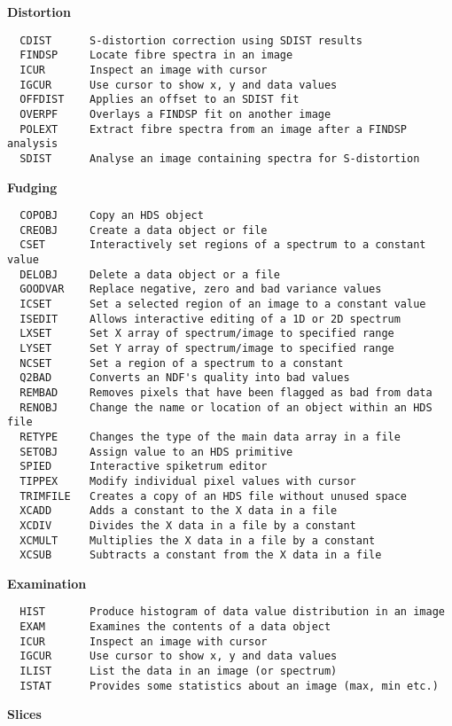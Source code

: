 \goodbreak
{\bf Distortion}
\begin{verbatim}
  CDIST      S-distortion correction using SDIST results
  FINDSP     Locate fibre spectra in an image
  ICUR       Inspect an image with cursor
  IGCUR      Use cursor to show x, y and data values
  OFFDIST    Applies an offset to an SDIST fit
  OVERPF     Overlays a FINDSP fit on another image
  POLEXT     Extract fibre spectra from an image after a FINDSP analysis
  SDIST      Analyse an image containing spectra for S-distortion
\end{verbatim}
\goodbreak
{\bf Fudging}
\begin{verbatim}
  COPOBJ     Copy an HDS object
  CREOBJ     Create a data object or file
  CSET       Interactively set regions of a spectrum to a constant value
  DELOBJ     Delete a data object or a file
  GOODVAR    Replace negative, zero and bad variance values
  ICSET      Set a selected region of an image to a constant value
  ISEDIT     Allows interactive editing of a 1D or 2D spectrum
  LXSET      Set X array of spectrum/image to specified range
  LYSET      Set Y array of spectrum/image to specified range
  NCSET      Set a region of a spectrum to a constant
  Q2BAD      Converts an NDF's quality into bad values
  REMBAD     Removes pixels that have been flagged as bad from data
  RENOBJ     Change the name or location of an object within an HDS file
  RETYPE     Changes the type of the main data array in a file
  SETOBJ     Assign value to an HDS primitive
  SPIED      Interactive spiketrum editor
  TIPPEX     Modify individual pixel values with cursor
  TRIMFILE   Creates a copy of an HDS file without unused space
  XCADD      Adds a constant to the X data in a file
  XCDIV      Divides the X data in a file by a constant
  XCMULT     Multiplies the X data in a file by a constant
  XCSUB      Subtracts a constant from the X data in a file
\end{verbatim}
\goodbreak
{\bf Examination}
\begin{verbatim}
  HIST       Produce histogram of data value distribution in an image
  EXAM       Examines the contents of a data object
  ICUR       Inspect an image with cursor
  IGCUR      Use cursor to show x, y and data values
  ILIST      List the data in an image (or spectrum)
  ISTAT      Provides some statistics about an image (max, min etc.)
\end{verbatim}
\goodbreak
{\bf Slices}
